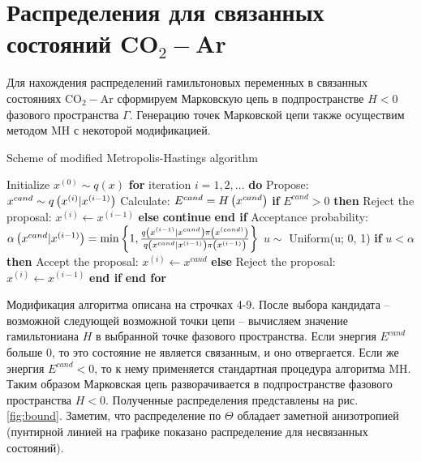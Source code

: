 \section{Распределения для связанных состояний CO$_2-$Ar}


Для нахождения распределений гамильтоновых переменных в связанных состояниях CO$_2-$Ar сформируем Марковскую цепь в подпространстве $H < 0$ фазового пространства $\Gamma$. Генерацию точек Марковской цепи также осуществим методом MH с некоторой модификацией.

\begin{algorithm}[!h]
\begin{algorithmic}[1]
		\caption{Scheme of modified Metropolis-Hastings algorithm} \label{bound}
\State Initialize $x^{(0)} \sim q(x)$
\State \textbf{for} iteration $i = 1, 2, \dots$ \textbf{do}
\State \quad Propose: $x^{cand} \sim q \left( x^{(i)} | x^{(i-1)} \right)$
\State \quad Calculate: $E^{cand} = H \left( x^{cand} \right)$ 
\State \quad \textbf{if} $E^{cand} > 0$ \textbf{then}
\State \qquad Reject the proposal: $x^{(i)} \gets x^{(i - 1)}$
\State \quad \textbf{else}
\State \qquad \textbf{continue}
\State \quad \textbf{end if}
\State \quad Acceptance probability:
\State \qquad $\alpha \left( x^{cand} | x^{(i-1)} \right) = \min \left\{ 1, \frac{q \left( x^{(i-1)} | x^{cand} \right) \pi \left( x^{(cand)} \right) }{ q \left( x^{cand} | x^{(i-1)} \right) \pi \left( x^{(i-1)} \right)} \right\}$
\State \quad $u \sim$ Uniform(u; 0, 1)
\State \quad \textbf{if} $u < \alpha$ \textbf{then}
\State \qquad Accept the proposal: $x^{(i)} \gets x^{cand}$
\State \quad \textbf{else}
\State \qquad Reject the proposal: $x^{(i)} \gets x^{(i-1)}$
\State \quad \textbf{end if}
\State \textbf{end for}
\end{algorithmic}
\end{algorithm}

Модификация алгоритма описана на строчках 4-9. После выбора кандидата -- возможной следующей возможной точки цепи -- вычисляем значение гамильтониана $H$ в выбранной точке фазового пространства. Если энергия $E^{cand}$ больше 0, то это состояние не является связанным, и оно отвергается. Если же энергия $E^{cand} < 0$, то к нему применяется стандартная процедура алгоритма MH. Таким образом Марковская цепь разворачивается в подпространстве фазового пространства $H < 0$. Полученные распределения представлены на рис. \ref{fig:bound}. Заметим, что распределение по $\Theta$ обладает заметной анизотропией (пунтирной линией на графике показано распределение для несвязанных состояний).

